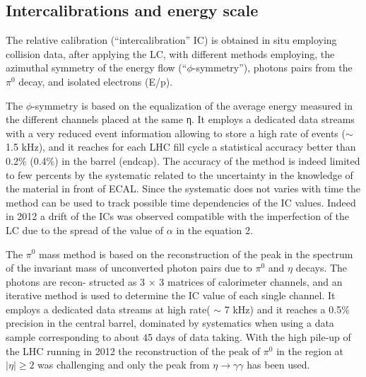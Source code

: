 \documentclass[journal]{IEEEtran}
\begin{document}
\subsection{Intercalibrations and energy scale}
The relative calibration (“intercalibration” IC) is obtained in situ employing collision data, after applying the LC, with different methods employing, the azimuthal symmetry of the energy flow (``$\phi$-symmetry''), photons pairs from the $\pi^0$ decay, and isolated electrons (E/p).

The $\phi$-symmetry is based on the equalization of the average energy measured in the different channels placed at the same η. It employs a dedicated data streams with a very reduced event information allowing to store a high rate of events ($\sim$ 1.5 kHz), and it reaches for each LHC fill cycle a statistical accuracy better than 0.2\% (0.4\%) in the barrel (endcap). The accuracy of the method is indeed limited to few percents by the systematic related to the uncertainty in the knowledge of the material in front of ECAL. Since the systematic does not varies with time the method can be used to track possible time dependencies of the IC values. Indeed in 2012 a drift of the ICs was observed compatible with the imperfection of the LC due to the spread of the value of $\alpha$ in the equation 2.

The $\pi^0$ mass method is based on the reconstruction of the peak in the spectrum of the invariant mass of unconverted photon pairs due to $\pi^0$ and $\eta$ decays. The photons are recon- structed as 3 × 3 matrices of calorimeter channels, and an iterative method is used to determine the IC value of each single channel. It employs a dedicated data streams at high rate( $\sim$ 7 kHz) and it reaches a 0.5\% precision in the central barrel, dominated by systematics when using a data sample corresponding to about 45 days of data taking. With the high pile-up of the LHC running in 2012 the reconstruction of the peak of $\pi^0$ in the region at $\vert\eta\vert\ge2$ was challenging and only the peak from $\eta\to\gamma\gamma$ has been used.
\end{document}
